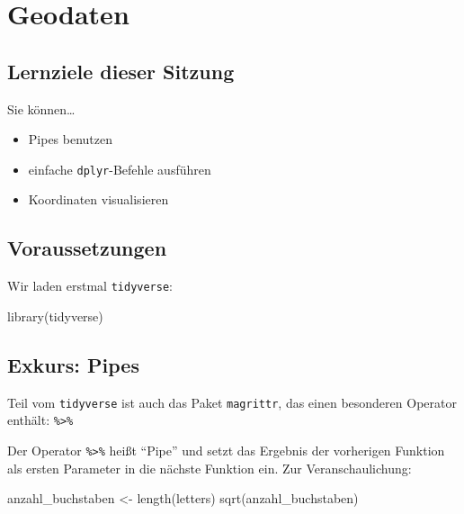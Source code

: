 \documentclass[11pt,german,a4paper]{article}
\newenvironment{Shaded}{\begin{snugshade}}{\end{snugshade}}
\newcommand{\FunctionTok}[1]{\textcolor[rgb]{0.00,0.00,0.00}{#1}}
\newcommand{\NormalTok}[1]{#1}
\newcommand{\OtherTok}[1]{\textcolor[rgb]{0.56,0.35,0.01}{#1}}
\providecommand{\tightlist}{%
  \setlength{\itemsep}{0pt}\setlength{\parskip}{0pt}}
\begin{document}
\hypertarget{geodaten}{%
\section{Geodaten}\label{geodaten}}

\hypertarget{lernziele-dieser-sitzung-2}{%
\subsection{Lernziele dieser Sitzung}\label{lernziele-dieser-sitzung-2}}

Sie können\ldots{}

\begin{itemize}
\tightlist
\item
  Pipes benutzen
\item
  einfache \texttt{dplyr}-Befehle ausführen
\item
  Koordinaten visualisieren
\end{itemize}

\hypertarget{voraussetzungen-1}{%
\subsection{Voraussetzungen}\label{voraussetzungen-1}}

Wir laden erstmal \texttt{tidyverse}:

\begin{Shaded}
\begin{Highlighting}[]
\FunctionTok{library}\NormalTok{(tidyverse)}
\end{Highlighting}
\end{Shaded}

\hypertarget{exkurs-pipes}{%
\subsection{Exkurs: Pipes}\label{exkurs-pipes}}

Teil vom \texttt{tidyverse} ist auch das Paket \texttt{magrittr}, das einen besonderen Operator enthält: \texttt{\%\textgreater{}\%}

Der Operator \texttt{\%\textgreater{}\%} heißt ``Pipe'' und setzt das Ergebnis der vorherigen Funktion als ersten Parameter in die nächste Funktion ein. Zur Veranschaulichung:

\begin{Shaded}
\begin{Highlighting}[]
\NormalTok{anzahl\_buchstaben }\OtherTok{\textless{}{-}} \FunctionTok{length}\NormalTok{(letters)}
\FunctionTok{sqrt}\NormalTok{(anzahl\_buchstaben)}
\end{Highlighting}
\end{Shaded}
\end{document}

